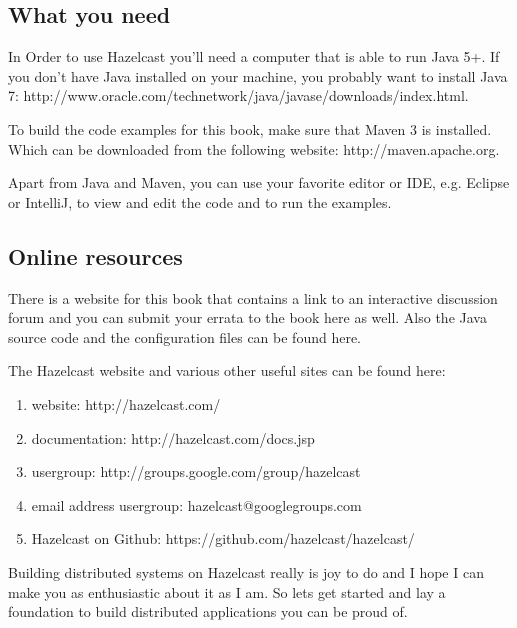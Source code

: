 \subsection*{What you need}
In Order to use Hazelcast you'll need a computer that is able to run Java 5+. If you don't have Java installed on your machine, you probably want to install Java 7: 
http://www.oracle.com/technetwork/java/javase/downloads/index.html. 

To build the code examples for this book, make sure that Maven 3 is installed. Which can be downloaded from the following website: http://maven.apache.org.

Apart from Java and Maven, you can use your favorite editor or IDE, e.g. Eclipse or IntelliJ, to  view and edit the code and to run the examples. 

\subsection*{Online resources}
There is a website for this book that contains a link to an interactive discussion forum and you can submit your errata to the book here as well. Also the Java source code and the configuration files can be found here. 

The Hazelcast website and various other useful sites can be found here:
\begin{enumerate}
\item website: http://hazelcast.com/
\item documentation: http://hazelcast.com/docs.jsp
\item usergroup: http://groups.google.com/group/hazelcast
\item email address usergroup: hazelcast@googlegroups.com
\item Hazelcast on Github: https://github.com/hazelcast/hazelcast/
\end{enumerate}
Building distributed systems on Hazelcast really is joy to do and I hope I can make you as enthusiastic about it as I am. So lets get started and lay a foundation to build distributed applications you can be proud of.
